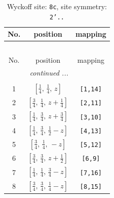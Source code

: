 \documentclass[fleqn,8pt]{jsarticle}
\begin{document}
\renewcommand{\arraystretch}{1.2}
\begin{longtable}{ccc}
\caption{Wyckoff site: {\tt 8c}, site symmetry: {\tt 2'..}}
 \\
 \hline \hline
No. & position & mapping \\ \hline \endfirsthead

\multicolumn{2}{l}{\tablename\ \thetable{}} \\
 \hline \hline
No. & position & mapping \\ \hline \endhead

 \hline \hline
\multicolumn{2}{r}{\footnotesize\it continued ...} \\ \endfoot

 \hline \hline
\multicolumn{2}{r}{} \\ \endlastfoot

1 & $\left[ \frac{1}{4},\, \frac{1}{4},\, z \right]$ & {\tt [1,14]} \\ \hline
2 & $\left[ \frac{3}{4},\, \frac{1}{4},\, z + \frac{1}{4} \right]$ & {\tt [2,11]} \\ \hline
3 & $\left[ \frac{1}{4},\, \frac{3}{4},\, z + \frac{3}{4} \right]$ & {\tt [3,10]} \\ \hline
4 & $\left[ \frac{1}{4},\, \frac{3}{4},\, \frac{1}{2} - z \right]$ & {\tt [4,13]} \\ \hline
5 & $\left[ \frac{3}{4},\, \frac{1}{4},\, - z \right]$ & {\tt [5,12]} \\ \hline
6 & $\left[ \frac{3}{4},\, \frac{3}{4},\, z + \frac{1}{2} \right]$ & {\tt [6,9]} \\ \hline
7 & $\left[ \frac{1}{4},\, \frac{1}{4},\, \frac{3}{4} - z \right]$ & {\tt [7,16]} \\ \hline
8 & $\left[ \frac{3}{4},\, \frac{3}{4},\, \frac{1}{4} - z \right]$ & {\tt [8,15]} \\
\end{longtable}
\renewcommand{\arraystretch}{1.2}
\end{document}
